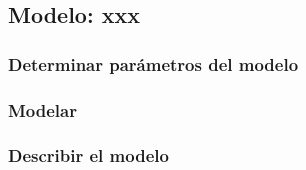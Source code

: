 \subsection{Modelo: xxx}

\subsubsection{Determinar parámetros del modelo}
\subsubsection{Modelar}
\subsubsection{Describir el modelo}
